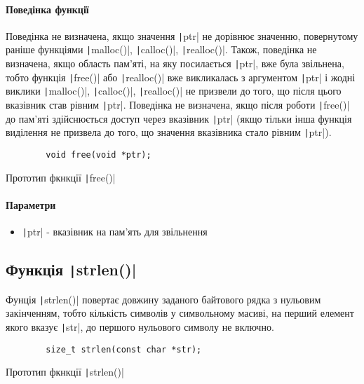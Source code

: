 \paragraph{Поведінка функції}
Поведінка не визначена, якщо значення \texttt|ptr| не дорівнює значенню, повернутому раніше функціями \texttt|malloc()|, \texttt|calloc()|, \texttt|realloc()|.
Також, поведінка не визначена, якщо область пам'яті, на яку посилається \texttt|ptr|, вже була звільнена, тобто функція \texttt|free()| або \texttt|realloc()| вже викликалась з аргументом \texttt|ptr| і жодні виклики \texttt|malloc()|, \texttt|calloc()|, \texttt|realloc()| не призвели до того, що після цього вказівник став рівним \texttt|ptr|.
Поведінка не визначена, якщо після роботи \texttt|free()| до пам'яті здійснюється доступ через вказівник \texttt|ptr| (якщо тільки інша функція виділення не призвела до того, що значення вказівника стало рівним \texttt|ptr|).
\begin{listing}[H]
	\begin{verbatim}
		void free(void *ptr);
	\end{verbatim}
	\caption[Прототип ]{Прототип фкнкції \texttt|free()|}
	\label{lst:f:free}
\end{listing}
\paragraph{Параметри}
\begin{itemize}
	\item \texttt|ptr| - вказівник на пам'ять для звільнення
\end{itemize}

\subsection[Функція \code{strlen()}]{Функція \texttt|strlen()|}
Фунція \texttt|strlen()| повертає довжину заданого байтового рядка з нульовим закінченням, тобто кількість символів у символьному масиві, на перший елемент якого вказує \texttt|str|, до першого нульового символу не включно.
\begin{listing}[H]
	\begin{verbatim}
		size_t strlen(const char *str);
	\end{verbatim}
	\caption[Прототип ]{Прототип фкнкції \texttt|strlen()|}
	\label{lst:f:strlen}
\end{listing}

